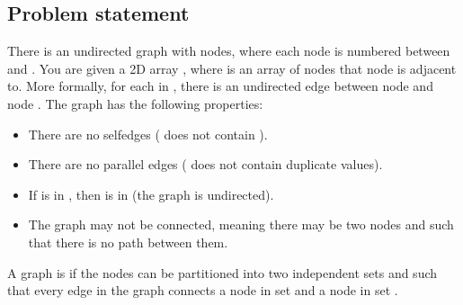 \documentclass[letterpaper,12pt,english]{book}
\begin{document}
\subsection{Problem statement\sphinxfootnotemark[69]}
\label{\detokenize{Graph/785_Is_Graph_Bipartite:problem-statement}}%
\begin{footnotetext}[69]\sphinxAtStartFootnote
{}
%
\end{footnotetext}\ignorespaces 
\sphinxAtStartPar
There is an undirected graph with  nodes, where each node is numbered between  and . You are given a 2D array , where  is an array of nodes that node  is adjacent to. More formally, for each  in , there is an undirected edge between node  and node . The graph has the following properties:
\begin{itemize}
\item {} 
\sphinxAtStartPar
There are no self\sphinxhyphen{}edges ( does not contain ).

\item {} 
\sphinxAtStartPar
There are no parallel edges ( does not contain duplicate values).

\item {} 
\sphinxAtStartPar
If  is in , then  is in  (the graph is undirected).

\item {} 
\sphinxAtStartPar
The graph may not be connected, meaning there may be two nodes  and  such that there is no path between them.

\end{itemize}

\sphinxAtStartPar
A graph is  if the nodes can be partitioned into two independent sets  and  such that every edge in the graph connects a node in set  and a node in set .
\end{document}
